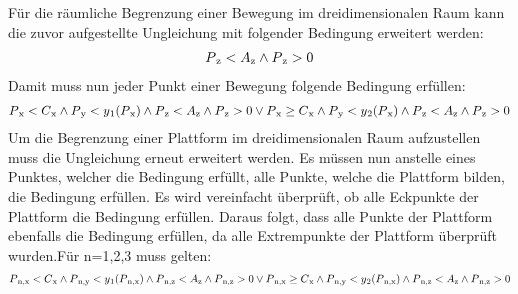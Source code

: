 		Für die räumliche Begrenzung einer Bewegung im dreidimensionalen Raum kann die zuvor aufgestellte Ungleichung mit folgender Bedingung erweitert werden:
		\begin{align}
			P\textsubscript{z}<A\textsubscript{z}\land P\textsubscript{z}>0
		\end{align}
		Damit muss nun jeder Punkt einer Bewegung folgende Bedingung erfüllen:
		\begin{align}
			P\textsubscript{x}<C\textsubscript{x} 
			\land 	P\textsubscript{y}<y\textsubscript{1}(P\textsubscript{x})
			\land	P\textsubscript{z}<A\textsubscript{z}
			\land 	P\textsubscript{z}>0 
			\lor
			P\textsubscript{x} \geq C\textsubscript{x} 
			\land 	P\textsubscript{y}<y\textsubscript{2}(P\textsubscript{x})
			\land	P\textsubscript{z}<A\textsubscript{z}
			\land 	P\textsubscript{z}>0
		\end{align}
		Um die Begrenzung einer Plattform im dreidimensionalen Raum aufzustellen muss die Ungleichung erneut erweitert werden. Es müssen nun anstelle eines Punktes, welcher die Bedingung erfüllt, alle Punkte, welche die Plattform bilden, die Bedingung erfüllen. Es wird vereinfacht überprüft, ob alle Eckpunkte der Plattform die Bedingung erfüllen. Daraus folgt, dass alle Punkte der Plattform ebenfalls die Bedingung erfüllen, da alle Extrempunkte der Plattform überprüft wurden.Für n=1,2,3 muss gelten:
		\begin{align}
		P\textsubscript{n,x}<C\textsubscript{x} 
		\land 	P\textsubscript{n,y}<y\textsubscript{1}(P\textsubscript{n,x})
		\land	P\textsubscript{n,z}<A\textsubscript{z}
		\land 	P\textsubscript{n,z}>0
		\lor
		P\textsubscript{n,x} \geq C\textsubscript{x} 
		\land 	P\textsubscript{n,y}<y\textsubscript{2}(P\textsubscript{n,x})
		\land	P\textsubscript{n,z}<A\textsubscript{z}
		\land 	P\textsubscript{n,z}>0
		\end{align}
	\pagebreak